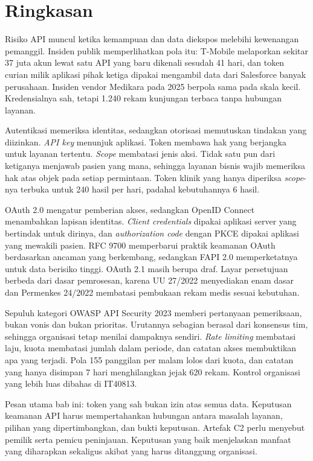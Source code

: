 \section{Ringkasan}

Risiko API muncul ketika kemampuan dan data diekspos melebihi kewenangan pemanggil. Insiden publik memperlihatkan pola itu: T-Mobile melaporkan
sekitar 37 juta akun lewat satu API yang baru dikenali sesudah 41 hari, dan token curian milik aplikasi pihak ketiga dipakai mengambil data dari
Salesforce banyak perusahaan. Insiden vendor Medikara pada 2025 berpola sama pada skala kecil. Kredensialnya sah, tetapi 1.240 rekam kunjungan
terbaca tanpa hubungan layanan.

Autentikasi memeriksa identitas, sedangkan otorisasi memutuskan tindakan yang diizinkan. \textit{API key} menunjuk aplikasi. Token membawa hak yang
berjangka untuk layanan tertentu. \textit{Scope} membatasi jenis aksi. Tidak satu pun dari ketiganya menjawab pasien yang mana, sehingga layanan bisnis
wajib memeriksa hak atas objek pada setiap permintaan. Token klinik yang hanya diperiksa \textit{scope}-nya terbuka untuk 240 hasil per hari, padahal
kebutuhannya 6 hasil.

OAuth 2.0 mengatur pemberian akses, sedangkan OpenID Connect menambahkan lapisan identitas. \textit{Client credentials} dipakai aplikasi server yang
bertindak untuk dirinya, dan \textit{authorization code} dengan PKCE dipakai aplikasi yang mewakili pasien. RFC 9700 memperbarui praktik keamanan
OAuth berdasarkan ancaman yang berkembang, sedangkan FAPI 2.0 memperketatnya untuk data berisiko tinggi. OAuth 2.1 masih berupa draf. Layar persetujuan
berbeda dari dasar pemrosesan, karena UU 27/2022 menyediakan enam dasar dan Permenkes 24/2022 membatasi pembukaan rekam medis sesuai kebutuhan.

Sepuluh kategori OWASP API Security 2023 memberi pertanyaan pemeriksaan, bukan vonis dan bukan prioritas. Urutannya sebagian berasal dari konsensus tim,
sehingga organisasi tetap menilai dampaknya sendiri. \textit{Rate limiting} membatasi laju, kuota membatasi jumlah dalam periode, dan catatan akses
membuktikan apa yang terjadi. Pola 155 panggilan per malam lolos dari kuota, dan catatan yang hanya disimpan 7 hari menghilangkan jejak 620 rekam. Kontrol
organisasi yang lebih luas dibahas di IT40813.

Pesan utama bab ini: token yang sah bukan izin atas semua data. Keputusan keamanan API harus mempertahankan hubungan antara masalah layanan, pilihan yang
dipertimbangkan, dan bukti keputusan. Artefak C2 perlu menyebut pemilik serta pemicu peninjauan. Keputusan yang baik menjelaskan manfaat yang diharapkan
sekaligus akibat yang harus ditanggung organisasi.

